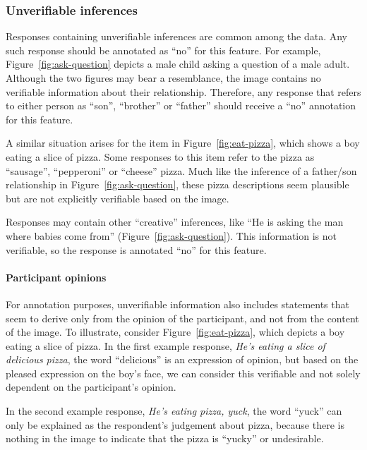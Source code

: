 \documentclass[12pt,notitlepage]{article}
\begin{document}
\subsubsection{Unverifiable inferences} Responses containing unverifiable inferences are common among the data. Any such response should be annotated as ``no'' for this feature. For example, Figure~\ref{fig:ask-question} depicts a male child asking a question of a male adult. Although the two figures may bear a resemblance, the image contains no verifiable information about their relationship. Therefore, any response that refers to either person as ``son'', ``brother'' or ``father'' should receive a ``no'' annotation for this feature.

A similar situation arises for the item in Figure~\ref{fig:eat-pizza}, which shows a boy eating a slice of pizza. Some responses to this item refer to the pizza as ``sausage'', ``pepperoni'' or ``cheese'' pizza. Much like the inference of a father/son relationship in Figure~\ref{fig:ask-question}, these pizza descriptions seem plausible but are not explicitly verifiable based on the image.


Responses may contain other ``creative'' inferences, like ``He is asking the man where babies come from'' (Figure~\ref{fig:ask-question}). This information is not verifiable, so the response is annotated ``no'' for this feature.

\paragraph{Participant opinions} For annotation purposes, unverifiable information also includes statements that seem to derive only from the opinion of the participant, and not from the content of the image. To illustrate, consider Figure~\ref{fig:eat-pizza}, which depicts a boy eating a slice of pizza. In the first example response, \textit{He's eating a slice of delicious pizza}, the word ``delicious'' is an expression of opinion, but based on the pleased expression on the boy's face, we can consider this verifiable and not solely dependent on the participant's opinion.

In the second example response, \textit{He's eating pizza, yuck}, the word ``yuck'' can only be explained as the respondent's judgement about pizza, because there is nothing in the image to indicate that the pizza is ``yucky'' or undesirable. 
\end{document}
